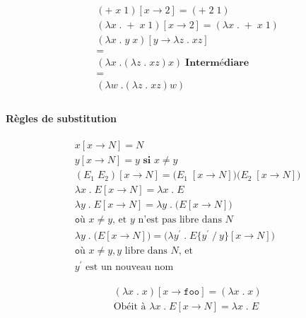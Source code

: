 \documentclass{report}
\begin{document}
\begin{multicols*}{3}
  \begin{EExample}{}{}
     \begin{align*}
        & (+ \; x \; 1) [x \rightarrow 2] = ( + \; 2 \; 1) \\
        & (\lambda x \; . \; + \; x \; 1) [x \rightarrow 2] 
        = (\lambda x \; . \; + \; x \; 1) \\
        & (\lambda x \; . \; y \; x) [y \rightarrow \lambda z \; . \; x z]  \\
        &= \\
        & (\lambda x \; . (\lambda z \; . \; x z) x) \; \textbf{Intermédiare}
        \\
        &= 
        \\
        & (\lambda w \; . (\lambda z \; . \; x z) w) \\ 
     \end{align*} 
  \end{EExample}

  \paragraph{Règles de substitution}
  \begin{align*}
    & x [ x \rightarrow N] = N \\ 
    & y [ x \rightarrow N] = y \textbf{ si } x \neq y   \\ 
    & (E_1 \; E_2) [ x \rightarrow  N] = 
    \bigl( E_1 \; [x \rightarrow N]\bigr) 
    \bigl( E_2 \; [x \rightarrow N]\bigr) \\ 
    & \lambda x \; . \; E [ x \rightarrow N] = \lambda x \; . \; E \\ 
    & \lambda y \; . \; E [ x \rightarrow N] = 
    \lambda y \; . \; \bigl( E[x \rightarrow N] \bigr) 
    \\
    &\texttt{où } x \neq y \text{, et }
    y \text{ n'est pas libre dans } N 
    \\ 
    & \lambda y \; . \; \bigl( E[x \rightarrow N] \bigr) 
    =
    \bigl( \lambda y^{\prime} \; . \; 
    E \{y^{\prime} \; /\ y \}[x \rightarrow N]\bigr)
    \\ 
    &\texttt{où } x \neq y, y \text{ libre dans } N \text{, et } \\
    &y^{\prime} \text{ est un nouveau nom}
  \end{align*}

  \begin{EExample}{}{}
      \begin{align*}
        & (\lambda x \; . \; x) [x \rightarrow \texttt{foo}  ] 
        = 
        (\lambda x \; . \; x)
        \\
        & \text{Obéit à } \lambda x \; . \; E [x \rightarrow N] 
        = 
        \lambda x\; . \; E
      \end{align*}


\end{EExample}
\end{multicols*}
\end{document}

